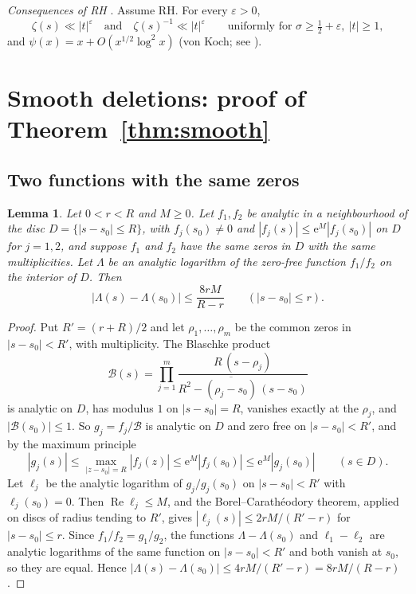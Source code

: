 \documentclass[11pt]{amsart}
\newtheorem{lemma}{Lemma}[section]
\theoremstyle{remark}
\numberwithin{equation}{section}
\newcommand{\eps}{\varepsilon}
\newcommand{\e}{\mathrm{e}}
\DeclareMathOperator{\re}{Re}
\begin{document}
\smallskip\noindent\emph{Consequences of RH} \cite[Theorem~14.2]{Tit}. Assume RH. For every $\eps>0$,
\begin{equation}\label{eq:RH1}
\zeta(s)\ll|t|^{\eps}\quad\text{and}\quad \zeta(s)^{-1}\ll|t|^{\eps}\qquad\text{uniformly for }\sigma\ge\tfrac12+\eps,\ |t|\ge1,
\end{equation}
and $\psi(x)=x+O(x^{1/2}\log^2x)$ (von Koch; see \cite[Theorem~13.1]{MVbook}).

\section{Smooth deletions: proof of Theorem~\ref{thm:smooth}}\label{sec:smooth}

\subsection{Two functions with the same zeros}

\begin{lemma}\label{lem:blaschke}
Let $0<r<R$ and $M\ge0$. Let $f_1,f_2$ be analytic in a neighbourhood of the disc $D=\{|s-s_0|\le R\}$, with $f_j(s_0)\ne0$ and $|f_j(s)|\le \e^{M}|f_j(s_0)|$ on $D$ for $j=1,2$, and suppose $f_1$ and $f_2$ have the same zeros in $D$ with the same multiplicities. Let $\Lambda$ be an analytic logarithm of the zero-free function $f_1/f_2$ on the interior of $D$. Then
\[
|\Lambda(s)-\Lambda(s_0)|\le\frac{8rM}{R-r}\qquad(|s-s_0|\le r).
\]
\end{lemma}

\begin{proof}
Put $R'=(r+R)/2$ and let $\rho_1,\dots,\rho_m$ be the common zeros in $|s-s_0|<R'$, with multiplicity. The Blaschke product
\[
\mathcal B(s)=\prod_{j=1}^m\frac{R\,(s-\rho_j)}{R^2-\overline{(\rho_j-s_0)}\,(s-s_0)}
\]
is analytic on $D$, has modulus $1$ on $|s-s_0|=R$, vanishes exactly at the $\rho_j$, and $|\mathcal B(s_0)|\le1$. So $g_j=f_j/\mathcal B$ is analytic on $D$ and zero free on $|s-s_0|<R'$, and by the maximum principle
\[
|g_j(s)|\le\max_{|z-s_0|=R}|f_j(z)|\le \e^{M}|f_j(s_0)|\le \e^{M}|g_j(s_0)|\qquad(s\in D).
\]
Let $\ell_j$ be the analytic logarithm of $g_j/g_j(s_0)$ on $|s-s_0|<R'$ with $\ell_j(s_0)=0$. Then $\re\ell_j\le M$, and the Borel--Carath\'eodory theorem, applied on discs of radius tending to $R'$, gives $|\ell_j(s)|\le 2rM/(R'-r)$ for $|s-s_0|\le r$. Since $f_1/f_2=g_1/g_2$, the functions $\Lambda-\Lambda(s_0)$ and $\ell_1-\ell_2$ are analytic logarithms of the same function on $|s-s_0|<R'$ and both vanish at $s_0$, so they are equal. Hence $|\Lambda(s)-\Lambda(s_0)|\le 4rM/(R'-r)=8rM/(R-r)$.
\end{proof}
\end{document}
